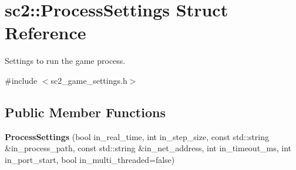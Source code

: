 \hypertarget{structsc2_1_1_process_settings}{}\section{sc2\+:\+:Process\+Settings Struct Reference}
\label{structsc2_1_1_process_settings}


Settings to run the game process.  




{\ttfamily \#include $<$sc2\+\_\+game\+\_\+settings.\+h$>$}

\subsection*{Public Member Functions}
\begin{DoxyCompactItemize}
\item 
\mbox{\label{structsc2_1_1_process_settings_ad021bbe8541383acbcbf2de1cfe4aafa}} 
{\bfseries Process\+Settings} (bool in\+\_\+real\+\_\+time, int in\+\_\+step\+\_\+size, const std\+::string \&in\+\_\+process\+\_\+path, const std\+::string \&in\+\_\+net\+\_\+address, int in\+\_\+timeout\+\_\+ms, int in\+\_\+port\+\_\+start, bool in\+\_\+multi\+\_\+threaded=false)
\end{DoxyCompactItemize}
